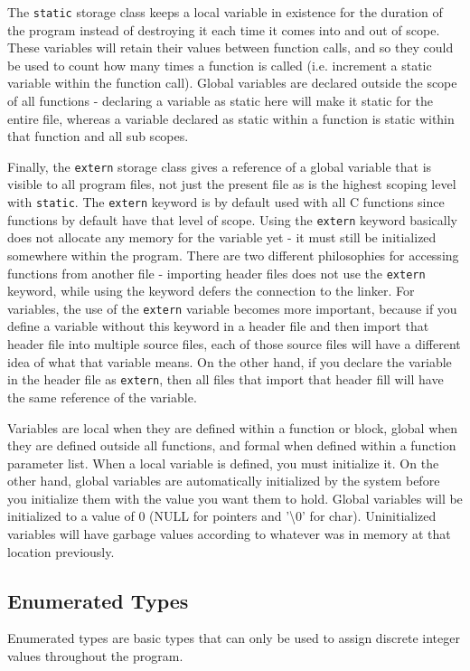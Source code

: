 \documentclass[10pt]{article}
\begin{document}
The {\tt static} storage class keeps a local variable in existence for the duration of the program instead of destroying it each time it comes into and out of scope. These variables will retain their values between function calls, and so they could be used to count how many times a function is called (i.e. increment a static variable within the function call). Global variables are declared outside the scope of all functions - declaring a variable as static here will make it static for the entire file, whereas a variable declared as static within a function is static within that function and all sub scopes. 

Finally, the {\tt extern} storage class gives a reference of a global variable that is visible to all program files, not just the present file as is the highest scoping level with {\tt static}. The {\tt extern} keyword is by default used with all C functions since functions by default have that level of scope. Using the {\tt extern} keyword basically does not allocate any memory for the variable yet - it must still be initialized somewhere within the program. There are two different philosophies for accessing functions from another file - importing header files does not use the {\tt extern} keyword, while using the keyword defers the connection to the linker. For variables, the use of the {\tt extern} variable becomes more important, because if you define a variable without this keyword in a header file and then import that header file into multiple source files, each of those source files will have a different idea of what that variable means. On the other hand, if you declare the variable in the header file as {\tt extern}, then all files that import that header fill will have the same reference of the variable. 

Variables are local when they are defined within a function or block, global when they are defined outside all functions, and formal when defined within a function parameter list. When a local variable is defined, you must initialize it. On the other hand, global variables are automatically initialized by the system before you initialize them with the value you want them to hold. Global variables will be initialized to a value of 0 (NULL for pointers and '\textbackslash 0' for char). Uninitialized variables will have garbage values according to whatever was in memory at that location previously. 

\subsection{Enumerated Types}
Enumerated types are basic types that can only be used to assign discrete integer values throughout the program. 
\end{document}
